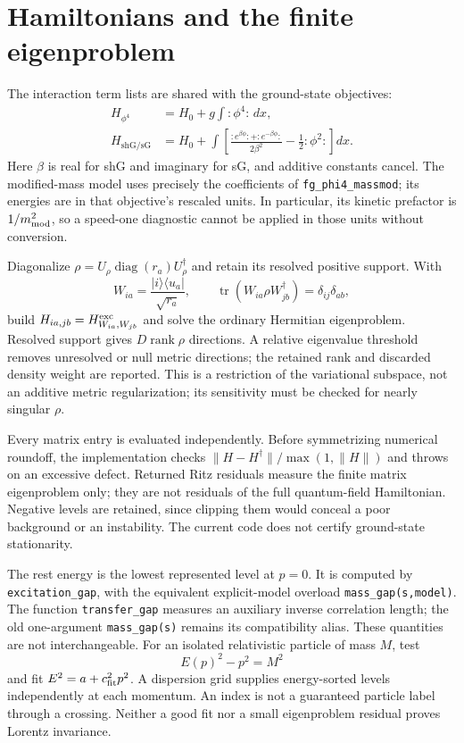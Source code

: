 \documentclass[11pt]{article}
\newcommand{\tr}{\operatorname{tr}}
\newcommand{\ket}[1]{\lvert #1\rangle}
\newcommand{\bra}[1]{\langle #1\rvert}
\begin{document}
\section{Hamiltonians and the finite eigenproblem}
The interaction term lists are shared with the ground-state objectives:
\begin{align}
 H_{\phi^4}&=H_0+g\int :\phi^4:\,dx,\\
 H_{\mathrm{shG/sG}}&=H_0+\int\left[
 \frac{:e^{\beta\phi}:+:e^{-\beta\phi}:}{2\beta^2}
              -\frac12:\phi^2:\right]dx.
\end{align}
Here $\beta$ is real for shG and imaginary for sG, and additive constants
cancel. The modified-mass model uses precisely the coefficients of
\texttt{fg\_phi4\_massmod}; its energies are in that objective's rescaled
units. In particular, its kinetic prefactor is $1/m_{\rm mod}^2$, so a
speed-one diagnostic cannot be applied in those units without conversion.

Diagonalize $\rho=U_\rho\operatorname{diag}(r_a)U_\rho^\dagger$ and retain
its resolved positive support. With
\begin{equation}
 W_{ia}=\frac{\ket i\bra{u_a}}{\sqrt{r_a}},
 \qquad \tr(W_{ia}\rho W_{jb}^\dagger)=\delta_{ij}\delta_{ab},
\end{equation}
build $H_{ia,jb}=H^{\rm exc}_{W_{ia},W_{jb}}$ and solve the ordinary
Hermitian eigenproblem. Resolved support gives $D\operatorname{rank}\rho$
directions. A relative eigenvalue threshold removes unresolved or null
metric directions; the retained rank and discarded density weight are
reported. This is a restriction of the variational subspace, not an additive
metric regularization; its sensitivity must be checked for nearly singular
$\rho$.

Every matrix entry is evaluated independently. Before symmetrizing numerical
roundoff, the implementation checks
$\|H-H^\dagger\|/\max(1,\|H\|)$ and throws on an excessive defect.
Returned Ritz residuals measure the finite matrix eigenproblem only; they
are not residuals of the full quantum-field Hamiltonian. Negative levels
are retained, since clipping them would conceal a poor background or an
instability. The current code does not certify ground-state stationarity.

The rest energy is the lowest represented level at $p=0$.
It is computed by \texttt{excitation\_gap}, with the equivalent explicit-model
overload \texttt{mass\_gap(s,model)}.
The function \texttt{transfer\_gap} measures an auxiliary inverse correlation length;
the old one-argument \texttt{mass\_gap(s)} remains its compatibility alias.
These quantities are not interchangeable.
For an isolated relativistic particle of mass $M$, test
\begin{equation}
 E(p)^2-p^2=M^2
\end{equation}
and fit $E^2=a+c_{\rm fit}^2p^2$. A dispersion grid supplies energy-sorted
levels independently at each momentum. An index is not a guaranteed particle
label through a crossing. Neither a good fit nor a small eigenproblem
residual proves Lorentz invariance.
\end{document}
